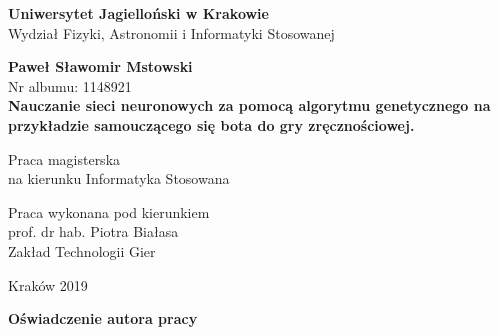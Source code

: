 \documentclass[12pt, oneside, a4paper]{report}
\begin{document}
  
\thispagestyle{empty}
\begin{titlepage}
    \begin{center}

           \Large
	\textbf{Uniwersytet Jagielloński w Krakowie}\vspace{0.2cm}\\ Wydział Fizyki, Astronomii i Informatyki Stosowanej
               \vspace*{1cm}
               
         \vspace{3cm}
         \Large
          \textbf{Paweł Sławomir Mstowski}\\\vspace{0.5cm}
         \normalsize Nr albumu: 1148921\\
             \vspace{2cm}
        \Huge
        \textbf{Nauczanie sieci neuronowych za pomocą algorytmu genetycznego na przykładzie samouczącego się bota do gry zręcznościowej.}
      
        \vspace{1.5cm}
        \normalsize
        Praca magisterska\\
        na kierunku Informatyka Stosowana\\ \vspace{0.15cm}
        
        \vfill
        \vspace{2cm}
       \begin{minipage}{1\textwidth}
\begin{flushright}
Praca wykonana pod kierunkiem\\
prof. dr hab. Piotra Białasa\\
Zakład Technologii Gier
\end{flushright}
\end{minipage}
        
        \vspace{2cm}
        \begin{center}
      Kraków 2019
        \end{center}
    \end{center}
\end{titlepage}

\newpage 
 \thispagestyle{empty}
\vspace{2.5cm}
\begin{flushleft}
\large \textbf{Oświadczenie autora pracy}\vspace{0.6cm}\\
\end{flushleft}
\end{document}
